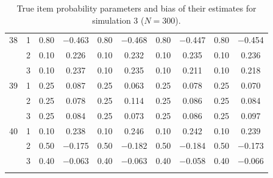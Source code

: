 \begin{longtable}{llcccccccc}
  38 & 1 & 0.80 & $-$0.463 & 0.80 & $-$0.468 & 0.80 & $-$0.447 & 0.80 & $-$0.454 \\ 
   & 2 & 0.10 & 0.226 & 0.10 & 0.232 & 0.10 & 0.235 & 0.10 & 0.236 \\ 
   & 3 & 0.10 & 0.237 & 0.10 & 0.235 & 0.10 & 0.211 & 0.10 & 0.218 \\ 
  39 & 1 & 0.25 & 0.087 & 0.25 & 0.063 & 0.25 & 0.078 & 0.25 & 0.070 \\ 
   & 2 & 0.25 & 0.078 & 0.25 & 0.114 & 0.25 & 0.086 & 0.25 & 0.084 \\ 
   & 3 & 0.25 & 0.084 & 0.25 & 0.073 & 0.25 & 0.086 & 0.25 & 0.097 \\ 
  40 & 1 & 0.10 & 0.238 & 0.10 & 0.246 & 0.10 & 0.242 & 0.10 & 0.239 \\ 
   & 2 & 0.50 & $-$0.175 & 0.50 & $-$0.182 & 0.50 & $-$0.184 & 0.50 & $-$0.173 \\ 
   & 3 & 0.40 & $-$0.063 & 0.40 & $-$0.063 & 0.40 & $-$0.058 & 0.40 & $-$0.066 \\ 
   \bottomrule
\caption{True item probability parameters and bias of their estimates for simulation 3 ($N = 300$).} 
\label{table:sim3_item_prob_bias_N300}
\end{longtable}
